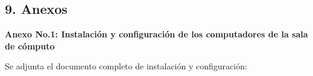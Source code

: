\begin{spacing}{1.5}
  \begin{tightcenter}
    \section{9. Anexos}
    \mylinespacing
  \end{tightcenter}

  \textbf{Anexo No.1: Instalación y configuración de los computadores de la sala de cómputo}

  Se adjunta el documento completo de instalación y configuración: 


  \mylinespacing
  \mylinespacing
  \begin{tightcenter}
  \end{tightcenter}
\end{spacing}
